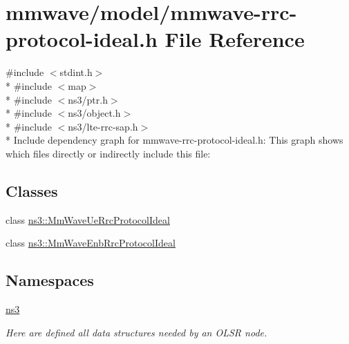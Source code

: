\hypertarget{mmwave-rrc-protocol-ideal_8h}{}\section{mmwave/model/mmwave-\/rrc-\/protocol-\/ideal.h File Reference}
\label{mmwave-rrc-protocol-ideal_8h}
{\ttfamily \#include $<$stdint.\+h$>$}\\*
{\ttfamily \#include $<$map$>$}\\*
{\ttfamily \#include $<$ns3/ptr.\+h$>$}\\*
{\ttfamily \#include $<$ns3/object.\+h$>$}\\*
{\ttfamily \#include $<$ns3/lte-\/rrc-\/sap.\+h$>$}\\*
Include dependency graph for mmwave-\/rrc-\/protocol-\/ideal.h\+:
This graph shows which files directly or indirectly include this file\+:
\subsection*{Classes}
\begin{DoxyCompactItemize}
\item 
class \hyperlink{classns3_1_1MmWaveUeRrcProtocolIdeal}{ns3\+::\+Mm\+Wave\+Ue\+Rrc\+Protocol\+Ideal}
\item 
class \hyperlink{classns3_1_1MmWaveEnbRrcProtocolIdeal}{ns3\+::\+Mm\+Wave\+Enb\+Rrc\+Protocol\+Ideal}
\end{DoxyCompactItemize}
\subsection*{Namespaces}
\begin{DoxyCompactItemize}
\item 
 \hyperlink{namespacens3}{ns3}
\begin{DoxyCompactList}\small\item\em Here are defined all data structures needed by an O\+L\+SR node. \end{DoxyCompactList}\end{DoxyCompactItemize}
